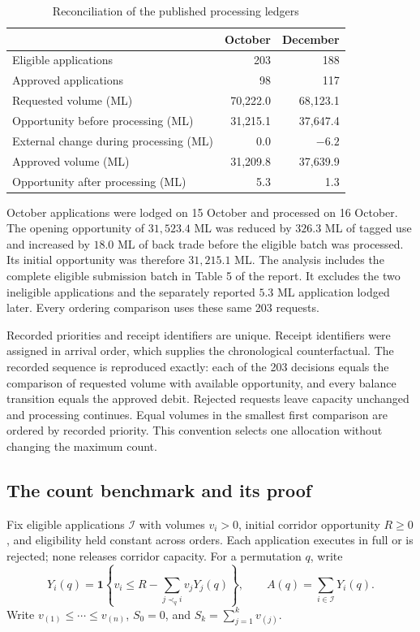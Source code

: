 \documentclass[ecta,draft,supplement]{econsocart}
\theoremstyle{definition}
\theoremstyle{definition}
\begin{document}
\begin{appendix}
\begin{table}[htbp]
\centering
\caption{Reconciliation of the published processing ledgers}
\label{tab:wateraudit}
\begin{tabular}{lrr}
\toprule
 & October & December \\
\midrule
Eligible applications & 203 & 188 \\
Approved applications & 98 & 117 \\
Requested volume (ML) & 70,222.0 & 68,123.1 \\
Opportunity before processing (ML) & 31,215.1 & 37,647.4 \\
External change during processing (ML) & 0.0 & $-6.2$ \\
Approved volume (ML) & 31,209.8 & 37,639.9 \\
Opportunity after processing (ML) & 5.3 & 1.3 \\
\bottomrule
\end{tabular}
\end{table}

October applications were lodged on 15 October and processed on 16 October.
The opening opportunity of $31,523.4$ ML was reduced by $326.3$ ML of
tagged use and increased by $18.0$ ML of back trade before the eligible
batch was processed. Its initial opportunity was therefore $31,215.1$ ML.
The analysis includes the complete eligible submission batch in Table 5
of the report. It excludes the two ineligible applications and the
separately reported $5.3$ ML application lodged later. Every ordering
comparison uses these same 203 requests.

Recorded priorities and receipt identifiers are unique. Receipt identifiers
were assigned in arrival order, which supplies the chronological
counterfactual. The recorded sequence is reproduced exactly: each of the
203 decisions equals the comparison of requested volume with available
opportunity, and every balance transition equals the approved debit.
Rejected requests leave capacity unchanged and processing continues.
Equal volumes in the smallest first comparison are ordered by recorded
priority. This convention selects one allocation without changing the
maximum count.

\subsection{The count benchmark and its proof}

Fix eligible applications $\mathcal I$ with volumes $v_i>0$, initial corridor
opportunity $R\ge0$, and eligibility held constant across orders. Each
application executes in full or is rejected; none releases corridor
capacity. For a permutation $q$, write
\[
 Y_i(q)=\mathbf 1\!\left\{
 v_i\le R-\sum_{j\prec_q i}v_jY_j(q)\right\},
 \qquad A(q)=\sum_{i\in\mathcal I}Y_i(q).
\]
Write $v_{(1)}\le\cdots\le v_{(n)}$, $S_0=0$, and
$S_k=\sum_{j=1}^k v_{(j)}$.


\end{appendix}
\end{document}
